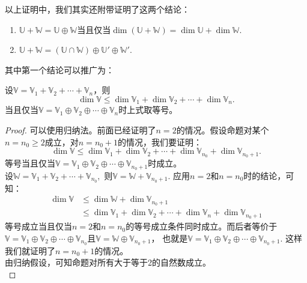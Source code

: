 \documentclass[12pt,UTF8]{ctexbook}
\begin{document}
以上证明中，我们其实还附带证明了这两个结论：
\begin{enumerate}
    \item $\mathbb{U} + \mathbb{W} = \mathbb{U} \oplus \mathbb{W}$当且仅当$\dim (\mathbb{U} + \mathbb{W}) = \dim \mathbb{U} + \dim \mathbb{W}.$
    \item $\mathbb{U} + \mathbb{W} = \left(\mathbb{U} \cap \mathbb{W}\right) \oplus \mathbb{U}' \oplus \mathbb{W}'.$
\end{enumerate}

其中第一个结论可以推广为：
\begin{pp}\label{pp:2_14}
    设$\mathbb{V} = \mathbb{V}_1 + \mathbb{V}_2 + \cdots + \mathbb{V}_n$，则
    $$ \dim \mathbb{V} \leq \dim \mathbb{V}_1 + \dim \mathbb{V}_2 + \cdots + \dim \mathbb{V}_n.$$
    当且仅当$\mathbb{V} = \mathbb{V}_1 \oplus \mathbb{V}_2 \oplus \cdots \oplus \mathbb{V}_n$时上式取等号。\\
\end{pp}

\begin{proof} %
    可以使用归纳法。前面已经证明了$n=2$的情况。假设命题对某个$n = n_0 \geq 2$成立，对$n = n_0+1$的情况，我们要证明：
    $$ \dim \mathbb{V} \leq \dim \mathbb{V}_1 + \dim \mathbb{V}_2 + \cdots + \dim \mathbb{V}_{n_0} + \dim \mathbb{V}_{n_0+1}.$$
    等号当且仅当$\mathbb{V} = \mathbb{V}_1 \oplus \mathbb{V}_2 \oplus \cdots \oplus \mathbb{V}_{n_0+1}$时成立。\\
    设$\mathbb{W} = \mathbb{V}_1 + \mathbb{V}_2 + \cdots + \mathbb{V}_{n_0},$ 则$\mathbb{V} = \mathbb{W} + \mathbb{V}_{n_0+1}.$
    应用$n=2$和$n=n_0$时的结论，可知：\\
    \begin{align*}
         \dim \mathbb{V} &\leq \dim \mathbb{W} + \dim \mathbb{V}_{n_0+1}  \\
               &\leq \dim \mathbb{V}_1 + \dim \mathbb{V}_2 + \cdots + \dim \mathbb{V}_n + \dim \mathbb{V}_{n_0+1} 
    \end{align*}
    等号成立当且仅当$n=2$和$n=n_0$的等号成立条件同时成立。而后者等价于$\mathbb{V} = \mathbb{V}_1 \oplus \mathbb{V}_2 \oplus \cdots \oplus \mathbb{V}_{n_0}$且$\mathbb{V} = \mathbb{W} \oplus \mathbb{V}_{n_0+1}$，
    也就是$\mathbb{V} = \mathbb{V}_1 \oplus \mathbb{V}_2 \oplus \cdots \oplus \mathbb{V}_{n_0+1}.$ 
    这样我们就证明了$n = n_0 + 1$的情况。\\
    由归纳假设，可知命题对所有大于等于2的自然数成立。\\
\end{proof}
\end{document}
